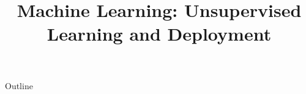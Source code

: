 \documentclass[xcolor=dvipsnames,compress,t,pdf,9pt]{beamer}
\title[\insertframenumber /\inserttotalframenumber]{Machine Learning: Unsupervised Learning and Deployment}
\begin{document}
	\begin{frame}
	\titlepage
	\end{frame}

	\begin{frame}{Outline}
	    \tableofcontents
	\end{frame}

	
	
	
\end{document}
